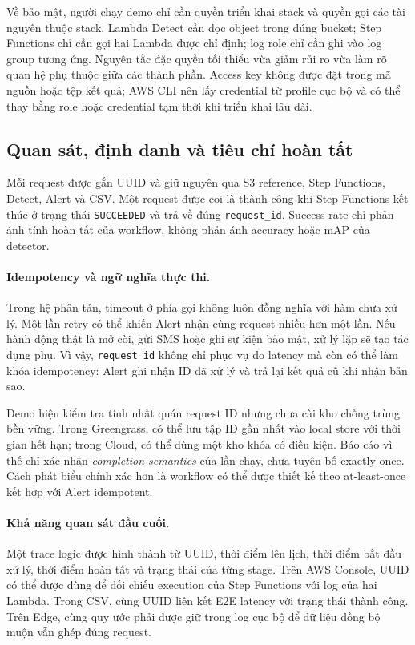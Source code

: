 Về bảo mật, người chạy demo chỉ cần quyền triển khai stack và quyền gọi các tài
nguyên thuộc stack. Lambda Detect cần đọc object trong đúng bucket; Step Functions
chỉ cần gọi hai Lambda được chỉ định; log role chỉ cần ghi vào log group tương ứng.
Nguyên tắc đặc quyền tối thiểu vừa giảm rủi ro vừa làm rõ quan hệ phụ thuộc giữa
các thành phần. Access key không được đặt trong mã nguồn hoặc tệp kết quả; AWS CLI
nên lấy credential từ profile cục bộ và có thể thay bằng role hoặc credential tạm
thời khi triển khai lâu dài.

\subsection{Quan sát, định danh và tiêu chí hoàn tất}

Mỗi request được gắn UUID và giữ nguyên qua S3 reference, Step Functions, Detect,
Alert và CSV. Một request được coi là thành công khi Step Functions kết thúc ở trạng
thái \texttt{SUCCEEDED} và trả về đúng \texttt{request\_id}. Success rate chỉ phản
ánh tính hoàn tất của workflow, không phản ánh accuracy hoặc mAP của detector.

\paragraph{Idempotency và ngữ nghĩa thực thi.}

Trong hệ phân tán, timeout ở phía gọi không luôn đồng nghĩa với hàm chưa xử lý.
Một lần retry có thể khiến Alert nhận cùng request nhiều hơn một lần. Nếu hành động
thật là mở còi, gửi SMS hoặc ghi sự kiện bảo mật, xử lý lặp sẽ tạo tác dụng phụ.
Vì vậy, \texttt{request\_id} không chỉ phục vụ đo latency mà còn có thể làm khóa
idempotency: Alert ghi nhận ID đã xử lý và trả lại kết quả cũ khi nhận bản sao.

Demo hiện kiểm tra tính nhất quán request ID nhưng chưa cài kho chống trùng bền
vững. Trong Greengrass, có thể lưu tập ID gần nhất vào local store với thời gian
hết hạn; trong Cloud, có thể dùng một kho khóa có điều kiện. Báo cáo vì thế chỉ xác
nhận \emph{completion semantics} của lần chạy, chưa tuyên bố exactly-once. Cách
phát biểu chính xác hơn là workflow có thể được thiết kế theo at-least-once kết hợp
với Alert idempotent.

\paragraph{Khả năng quan sát đầu cuối.}

Một trace logic được hình thành từ UUID, thời điểm lên lịch, thời điểm bắt đầu xử
lý, thời điểm hoàn tất và trạng thái của từng stage. Trên AWS Console, UUID có thể
được dùng để đối chiếu execution của Step Functions với log của hai Lambda. Trong
CSV, cùng UUID liên kết E2E latency với trạng thái thành công. Trên Edge, cùng quy
ước phải được giữ trong log cục bộ để dữ liệu đồng bộ muộn vẫn ghép đúng request.

